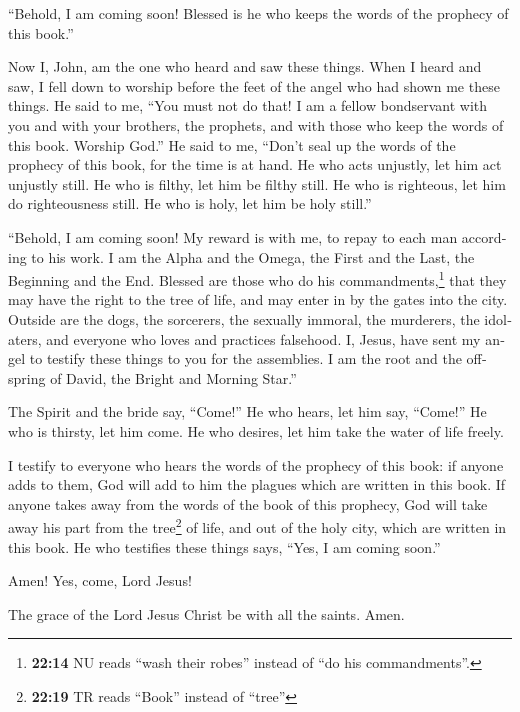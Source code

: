 \begin{paracol}{2}
\begin{otherlanguage}{english}
 ``Behold, I am coming soon! Blessed is he who keeps the
words of the prophecy of this book.''

 Now I, John, am the one who heard and saw these things.
When I heard and saw, I fell down to worship before the feet of the
angel who had shown me these things.  He said to me, ``You
must not do that! I am a fellow bondservant with you and with your
brothers, the prophets, and with those who keep the words of this book.
Worship God.''  He said to me, ``Don't seal up the words
of the prophecy of this book, for the time is at hand. 
He who acts unjustly, let him act unjustly still. He who is filthy, let
him be filthy still. He who is righteous, let him do righteousness
still. He who is holy, let him be holy still.''

 ``Behold, I am coming soon! My reward is with me, to
repay to each man according to his work.  I am the Alpha
and the Omega, the First and the Last, the Beginning and the End.
 Blessed are those who do his commandments,\footnote{\textbf{22:14}
  NU reads ``wash their robes'' instead of ``do his commandments''.}
that they may have the right to the tree of life, and may enter in by
the gates into the city.  Outside are the dogs, the
sorcerers, the sexually immoral, the murderers, the idolaters, and
everyone who loves and practices falsehood.  I, Jesus,
have sent my angel to testify these things to you for the assemblies. I
am the root and the offspring of David, the Bright and Morning Star.''

 The Spirit and the bride say, ``Come!'' He who hears,
let him say, ``Come!'' He who is thirsty, let him come. He who desires,
let him take the water of life freely.

 I testify to everyone who hears the words of the
prophecy of this book: if anyone adds to them, God will add to him the
plagues which are written in this book.  If anyone takes
away from the words of the book of this prophecy, God will take away his
part from the tree\footnote{\textbf{22:19} TR reads ``Book'' instead of
  ``tree''} of life, and out of the holy city, which are written in this
book.  He who testifies these things says, ``Yes, I am
coming soon.''

Amen! Yes, come, Lord Jesus!

 The grace of the Lord Jesus Christ be with all the
saints. Amen. \end{otherlanguage} \end{paracol}
